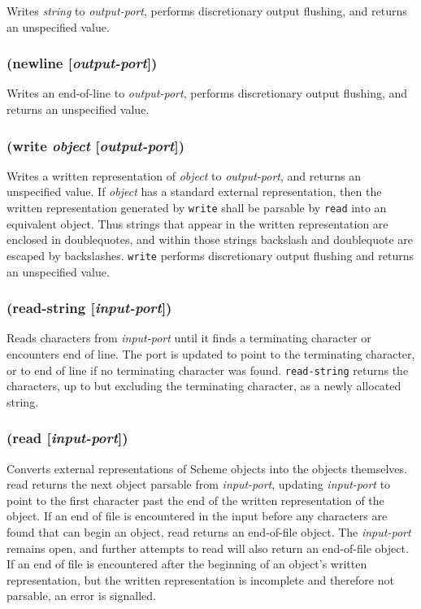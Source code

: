 \documentclass{article}
\begin{document}
Writes \emph{string} to \emph{output-port}, performs discretionary output flushing, and
returns an unspecified value.

\subsubsection{(newline [\emph{output-port}])}

Writes an end-of-line to \emph{output-port}, performs discretionary output flushing, and
returns an unspecified value.

\subsubsection{(write \emph{object} [\emph{output-port}])}

Writes a written representation of \emph{object} to \emph{output-port}, and returns an
unspecified value. If \emph{object} has a standard external representation, then the written
representation generated by \verb|write| shall be parsable by \verb|read| into an
equivalent object. Thus strings that appear in the written representation are enclosed in
doublequotes, and within those strings backslash and doublequote are escaped by backslashes.
\verb|write| performs discretionary output flushing and returns an unspecified value.

\subsubsection{(read-string [\emph{input-port}])}

Reads characters from \emph{input-port} until it finds a terminating character or encounters
end of line. The port is updated to point to the terminating character, or to end of line if
no terminating character was found. \verb|read-string| returns the characters, up to but
excluding the terminating character, as a newly allocated string.

\subsubsection{(read [\emph{input-port}])}

Converts external representations of Scheme objects into the objects themselves. read returns
the next object parsable from \emph{input-port}, updating \emph{input-port} to point to the
first character past the end of the written representation of the object. If an end of file is
encountered in the input before any characters are found that can begin an object, read
returns an end-of-file object. The \emph{input-port} remains open, and further attempts to
read will also return an end-of-file object. If an end of file is encountered after the
beginning of an object’s written representation, but the written representation is incomplete
and therefore not parsable, an error is signalled.
\end{document}
